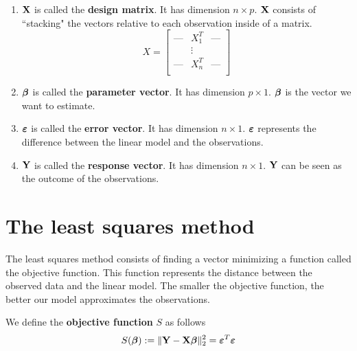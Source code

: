 \begin{definition}
    \begin{enumerate}[label=(\alph*)]
        \item $\mathbf{X}$ is called the \textbf{design matrix}. It has dimension $n \times p$. $\mathbf{X}$ consists of ``stacking" the vectors relative to each observation inside of a matrix.
              \[
                  X =
                  \begin{bmatrix}
                      \text{---} & X_1^T  & \text{---} \\
                                 & \vdots &            \\
                      \text{---} & X_n^T  & \text{---} \\
                  \end{bmatrix}
              \]
        \item $\boldsymbol{\beta}$ is called the \textbf{parameter vector}. It has dimension $p \times 1$. \(\boldsymbol{\beta}\) is the vector we want to estimate.
        \item $\boldsymbol{\varepsilon}$ is called the \textbf{error vector}. It has dimension $n \times 1$. \(\boldsymbol{\varepsilon}\) represents the difference between the linear model and the observations.
        \item $\mathbf{Y}$ is called the \textbf{response vector}. It has dimension $n \times 1$. \(\mathbf{Y}\) can be seen as the outcome of the observations.
    \end{enumerate}
\end{definition}


\section{The least squares method}
\label{section: least-squares}

The least squares method consists of finding a vector minimizing a function called the objective function. This function represents the distance between the observed data and the linear model. The smaller the objective function, the better our model approximates the observations.

\begin{definition}
    We define the \textbf{objective function} \( S \) as follows
    \begin{equation}
        \label{eqn: least squares objective function}
        S(\boldsymbol{\beta}) := \| \mathbf{Y}-\mathbf{X} \boldsymbol{\beta} \|_2^2 = \boldsymbol{\varepsilon}^{T} \boldsymbol{\varepsilon}
    \end{equation}
\end{definition}

